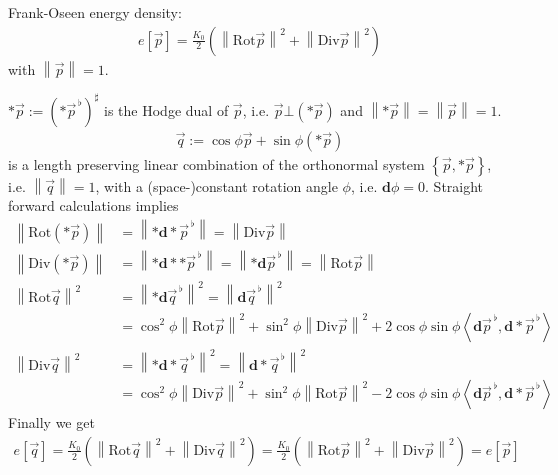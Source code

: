 \documentclass{scrartcl}
\newcommand{\exd}{\mathbf{d}}
\newcommand{\Div}{\text{Div}}
\newcommand{\Rot}{\text{Rot}}
\newcommand{\vecflat}[1]{\vec{#1}^{\,\flat}}
\begin{document}
Frank-Oseen energy density:
\begin{align}
  e[\vec{p}] = \frac{K_{0}}{2}\left( \left\| \Rot\vec{p} \right\|^{2} +  \left\| \Div\vec{p} \right\|^{2}\right)
\end{align}
with \( \left\| \vec{p} \right\| = 1 \).

\( *\vec{p} := \left( *\vecflat{p} \right)^{\sharp} \) is the Hodge dual of \( \vec{p} \), i.e. \( \vec{p}\bot (*\vec{p}) \) 
and  \(\left\| *\vec{p} \right\| = \left\| \vec{p} \right\| = 1 \).
\begin{align}
  \vec{q} := \cos\phi\vec{p} + \sin\phi (*\vec{p})
\end{align}
is a length preserving linear combination of the orthonormal system  \( \left\{\vec{p}, *\vec{p}\right\} \), i.e. \( \left\| \vec{q} \right\| = 1 \),
with a (space-)constant rotation angle \( \phi \), i.e. \( \exd\phi=0 \).
Straight forward calculations implies
\begin{align}
   \left\| \Rot (*\vec{p}) \right\| &=  \left\| *\exd*\vecflat{p} \right\| = \left\| \Div\vec{p} \right\|\\
   \left\| \Div (*\vec{p}) \right\| &= \left\| *\exd**\vecflat{p}  \right\| = \left\| *\exd\vecflat{p}  \right\| = \left\|\Rot\vec{p}\right\|\\ 
   \left\| \Rot\vec{q} \right\|^{2} &= \left\| *\exd\vecflat{q} \right\|^{2} = \left\| \exd\vecflat{q} \right\|^{2} \\
                                    &=  \cos^{2}\phi\left\| \Rot\vec{p} \right\|^{2} 
                                      + \sin^{2}\phi\left\| \Div\vec{p} \right\|^{2}
                                      + 2\cos\phi\sin\phi\left\langle \exd\vecflat{p}, \exd * \vecflat{p} \right\rangle\\
  \left\| \Div\vec{q} \right\|^{2} &= \left\| *\exd*\vecflat{q} \right\|^{2} = \left\| \exd*\vecflat{q} \right\|^{2}\\
                                   &= \cos^{2}\phi\left\| \Div\vec{p} \right\|^{2} 
                                      + \sin^{2}\phi\left\| \Rot\vec{p} \right\|^{2}
                                      - 2\cos\phi\sin\phi\left\langle \exd\vecflat{p}, \exd * \vecflat{p} \right\rangle
\end{align}
Finally we get
\begin{align}
  e[\vec{q}] = \frac{K_{0}}{2}\left( \left\| \Rot\vec{q} \right\|^{2} +  \left\| \Div\vec{q} \right\|^{2}\right)
             = \frac{K_{0}}{2}\left( \left\| \Rot\vec{p} \right\|^{2} +  \left\| \Div\vec{p} \right\|^{2}\right)
             = e[\vec{p}]
\end{align}

  
\end{document}
